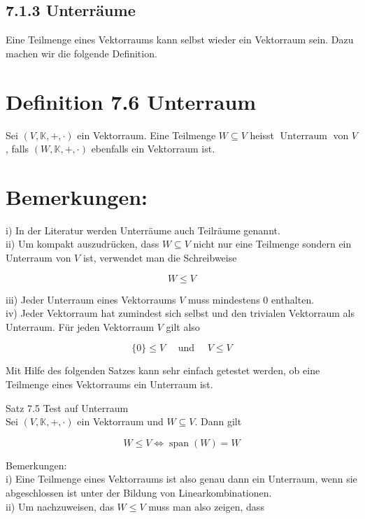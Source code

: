 \documentclass[10pt]{article}
\begin{document}
\subsection*{7.1.3 Unterräume}
Eine Teilmenge eines Vektorraums kann selbst wieder ein Vektorraum sein. Dazu machen wir die folgende Definition.

\section*{Definition 7.6 Unterraum}
Sei $(V, \mathbb{K},+, \cdot)$ ein Vektorraum. Eine Teilmenge $W \subseteq V$ heisst $\operatorname{Unterraum}$ von $V$, falls $(W, \mathbb{K},+, \cdot)$ ebenfalls ein Vektorraum ist.

\section*{Bemerkungen:}
i) In der Literatur werden Unterräume auch Teilräume genannt.\\
ii) Um kompakt auszudrücken, dass $W \subseteq V$ nicht nur eine Teilmenge sondern ein Unterraum von $V$ ist, verwendet man die Schreibweise


\begin{equation*}
W \leq V \tag{7.30}
\end{equation*}


iii) Jeder Unterraum eines Vektorraums $V$ muss mindestens 0 enthalten.\\
iv) Jeder Vektorraum hat zumindest sich selbst und den trivialen Vektorraum als Unterraum. Für jeden Vektorraum $V$ gilt also


\begin{equation*}
\{0\} \leq V \quad \text { und } \quad V \leq V \tag{7.31}
\end{equation*}


Mit Hilfe des folgenden Satzes kann sehr einfach getestet werden, ob eine Teilmenge eines Vektorraums ein Unterraum ist.

Satz 7.5 Test auf Unterraum\\
Sei $(V, \mathbb{K},+, \cdot)$ ein Vektorraum und $W \subseteq V$. Dann gilt


\begin{equation*}
W \leq V \Leftrightarrow \operatorname{span}(W)=W \tag{7.32}
\end{equation*}


Bemerkungen:\\
i) Eine Teilmenge eines Vektorraums ist also genau dann ein Unterraum, wenn sie abgeschlossen ist unter der Bildung von Linearkombinationen.\\
ii) Um nachzuweisen, das $W \leq V$ muss man also zeigen, dass
\end{document}
